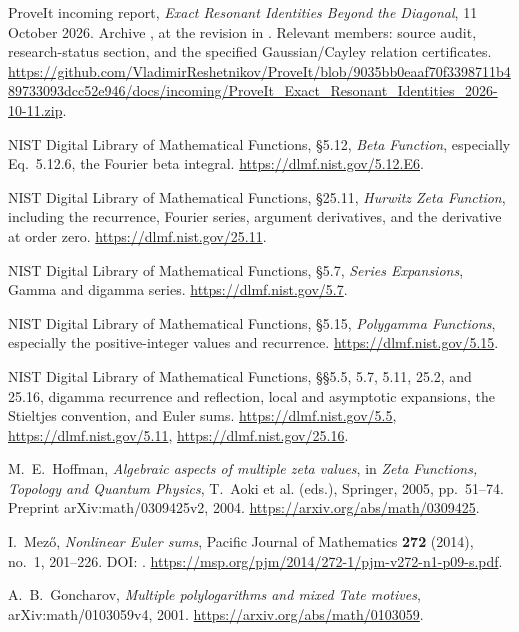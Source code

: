 ProveIt incoming report,
\emph{Exact Resonant Identities Beyond the Diagonal},
11 October 2026.
Archive ,
at the revision in \cite{repo:main}.
Relevant members: source audit, research-status section, and the
specified Gaussian/Cayley relation certificates.
\url{https://github.com/VladimirReshetnikov/ProveIt/blob/9035bb0eaaf70f3398711b489733093dcc52e946/docs/incoming/ProveIt_Exact_Resonant_Identities_2026-10-11.zip}.

NIST Digital Library of Mathematical Functions,
\S5.12, \emph{Beta Function}, especially Eq.~5.12.6,
the Fourier beta integral.
\url{https://dlmf.nist.gov/5.12.E6}.

NIST Digital Library of Mathematical Functions,
\S25.11, \emph{Hurwitz Zeta Function},
including the recurrence, Fourier series, argument derivatives,
and the derivative at order zero.
\url{https://dlmf.nist.gov/25.11}.

NIST Digital Library of Mathematical Functions,
\S5.7, \emph{Series Expansions}, Gamma and digamma series.
\url{https://dlmf.nist.gov/5.7}.

NIST Digital Library of Mathematical Functions,
\S5.15, \emph{Polygamma Functions}, especially the positive-integer
values and recurrence.
\url{https://dlmf.nist.gov/5.15}.

NIST Digital Library of Mathematical Functions,
\S\S5.5, 5.7, 5.11, 25.2, and 25.16,
digamma recurrence and reflection, local and asymptotic expansions,
the Stieltjes convention, and Euler sums.
\url{https://dlmf.nist.gov/5.5},
\url{https://dlmf.nist.gov/5.11},
\url{https://dlmf.nist.gov/25.16}.

M.~E.~Hoffman, \emph{Algebraic aspects of multiple zeta values},
in \emph{Zeta Functions, Topology and Quantum Physics},
T.~Aoki et al. (eds.), Springer, 2005, pp.~51--74.
Preprint arXiv:math/0309425v2, 2004.
\url{https://arxiv.org/abs/math/0309425}.

I.~Mez\H{o}, \emph{Nonlinear Euler sums},
Pacific Journal of Mathematics \textbf{272} (2014), no.~1, 201--226.
DOI: .
\url{https://msp.org/pjm/2014/272-1/pjm-v272-n1-p09-s.pdf}.

A.~B.~Goncharov, \emph{Multiple polylogarithms and mixed Tate motives},
arXiv:math/0103059v4, 2001.
\url{https://arxiv.org/abs/math/0103059}.
